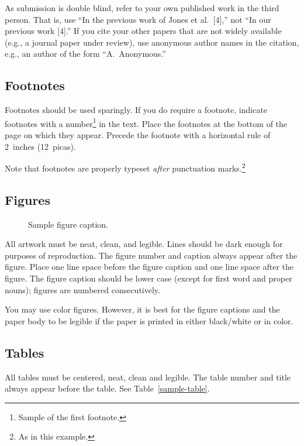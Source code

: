 \documentclass{article}
\begin{document}
As submission is double blind, refer to your own published work in the third
person. That is, use ``In the previous work of Jones et al.\ [4],'' not ``In our
previous work [4].'' If you cite your other papers that are not widely available
(e.g., a journal paper under review), use anonymous author names in the
citation, e.g., an author of the form ``A.\ Anonymous.''

\subsection{Footnotes}

Footnotes should be used sparingly.  If you do require a footnote, indicate
footnotes with a number\footnote{Sample of the first footnote.} in the
text. Place the footnotes at the bottom of the page on which they appear.
Precede the footnote with a horizontal rule of 2~inches (12~picas).

Note that footnotes are properly typeset \emph{after} punctuation
marks.\footnote{As in this example.}

\subsection{Figures}

\begin{figure}
  \centering
  \fbox{\rule[-.5cm]{0cm}{4cm} \rule[-.5cm]{4cm}{0cm}}
  \caption{Sample figure caption.}
\end{figure}

All artwork must be neat, clean, and legible. Lines should be dark enough for
purposes of reproduction. The figure number and caption always appear after the
figure. Place one line space before the figure caption and one line space after
the figure. The figure caption should be lower case (except for first word and
proper nouns); figures are numbered consecutively.

You may use color figures.  However, it is best for the figure captions and the
paper body to be legible if the paper is printed in either black/white or in
color.

\subsection{Tables}

All tables must be centered, neat, clean and legible.  The table number and
title always appear before the table.  See Table~\ref{sample-table}.
\end{document}
